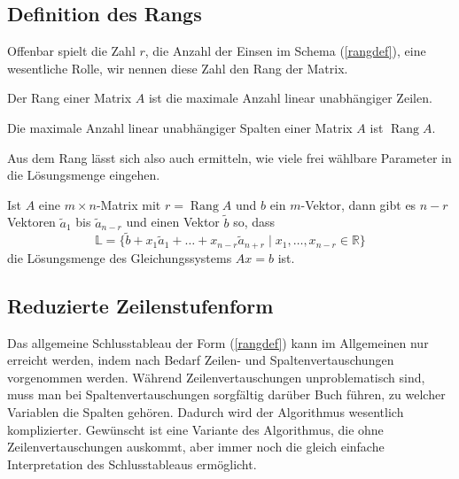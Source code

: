 \subsection{Definition des Rangs}
Offenbar spielt die Zahl $r$, die Anzahl der Einsen im Schema (\ref{rangdef}),
eine wesentliche Rolle, wir nennen diese Zahl den Rang der Matrix.

\begin{definition}
Der Rang einer Matrix $A$ ist die maximale Anzahl linear unabhängiger Zeilen.
\end{definition}
\begin{satz}
Die maximale Anzahl linear unabhängiger Spalten einer Matrix $A$ ist
$\operatorname{Rang}A$.
\end{satz}
Aus dem Rang lässt sich also auch ermitteln, wie viele frei wählbare
Parameter in die Lösungsmenge eingehen.
\begin{satz}
Ist $A$ eine $m\times n$-Matrix mit $r=\operatorname{Rang}A$ 
und $b$ ein $m$-Vektor, dann gibt es $n-r$ Vektoren $\tilde a_1$
bis $\tilde a_{n-r}$ und einen Vektor $\tilde b$ so, dass
\[
\mathbb L
=
\{
\tilde b+x_1\tilde a_1+\dots+x_{n-r}\tilde a_{n+r}\;|\;x_1,\dots,x_{n-r}\in\mathbb R
\}
\]
die Lösungsmenge des Gleichungssystems $Ax=b$ ist.
\end{satz}

\subsection{Reduzierte Zeilenstufenform}
Das allgemeine Schlusstableau der Form (\ref{rangdef}) kann im Allgemeinen nur
erreicht werden, indem nach Bedarf Zeilen- und Spaltenvertauschungen vorgenommen
werden.
Während Zeilenvertauschungen unproblematisch sind, muss man bei
Spaltenvertauschungen sorgfältig darüber Buch führen, zu welcher Variablen
die Spalten gehören.
Dadurch wird der Algorithmus wesentlich komplizierter.
Gewünscht ist eine Variante des Algorithmus, die ohne Zeilenvertauschungen
auskommt, aber immer noch die gleich einfache Interpretation des
Schlusstableaus ermöglicht.

